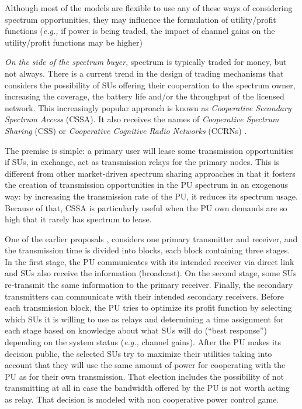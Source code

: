 Although most of the models are flexible to use any of these ways of considering spectrum opportunities, they may influence the formulation of utility/profit functions (\textit{e.g.,} if power is being traded, the impact of channel gains on the utility/profit functions may be higher)

\textit{On the side of the spectrum buyer}, spectrum is typically traded for money, but not always. There is a current trend in the design of trading mechanisms that considers the possibility of SUs offering their cooperation to the spectrum owner, increasing the coverage, the battery life and/or the throughput of the licensed network. This increasingly popular approach is known as \textit{Cooperative Secondary Spectrum Access} (CSSA). It also receives the names of \textit{Cooperative Spectrum Sharing} (CSS) or \textit{Cooperative Cognitive Radio Networks} (CCRNs) \cite{ref:Simeone2008,ref:Zhang2009,ref:Yi2010,ref:Vazquez2010,ref:Li2011,ref:Duan2011_Contract,ref:Duan2014,ref:Yan2013,ref:Feng2014}.

The premise is simple: a primary user will lease some transmission opportunities if SUs, in exchange, act as transmission relays for the primary nodes. This is different from other market-driven spectrum sharing approaches in that it fosters the creation of transmission opportunities in the PU spectrum in an exogenous way: by increasing the transmission rate of the PU, it reduces its spectrum usage. Because of that, CSSA is particularly useful when the PU own demands are so high that it rarely has spectrum to lease.

One of the earlier proposals \cite{ref:Simeone2008}, considers one primary transmitter and receiver, and the transmission time is divided into blocks, each block containing three stages. In the first stage, the PU communicates with its intended receiver via direct link and SUs also receive the information (broadcast). On the second stage, some SUs re-transmit the same information to the primary receiver. Finally, the secondary transmitters can communicate with their intended secondary receivers. Before each transmission block, the PU tries to optimize its profit function by selecting which SUs it is willing to use as relays and determining a time assignment for each stage based on knowledge about what SUs will do (``best response'') depending on the system status (\textit{e.g.,} channel gains). After the PU makes its decision public, the selected SUs try to maximize their utilities taking into account that they will use the same amount of power for cooperating with the PU as for their own transmission. That election includes the possibility of not transmitting at all in case the bandwidth offered by the PU is not worth acting as relay. That decision is modeled with non cooperative power control game.

